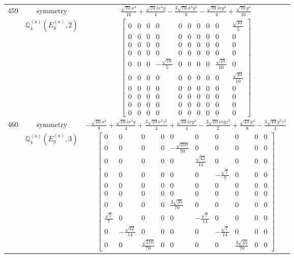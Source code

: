 \documentclass[fleqn,8pt,landscape]{jsarticle}
\begin{document}
\begin{longtable}{ccc}
$ 459 $ & $ \text{symmetry} $ & $ \frac{\sqrt{70} x^{4}}{16} + \frac{\sqrt{70} i x^{3} y}{4} - \frac{3 \sqrt{70} x^{2} y^{2}}{8} - \frac{\sqrt{70} i x y^{3}}{4} + \frac{\sqrt{70} y^{4}}{16} $ \\
$  $ & $ \mathbb{Q}_{4}^{(a)}(E_{g}^{(a)},2) $ & $ \begin{bmatrix} 0 & 0 & 0 & 0 & 0 & 0 & 0 & 0 & 0 & \frac{\sqrt{10}}{5} \\ 0 & 0 & 0 & 0 & 0 & 0 & 0 & 0 & 0 & 0 \\ 0 & 0 & 0 & 0 & 0 & 0 & 0 & 0 & 0 & 0 \\ 0 & 0 & 0 & 0 & 0 & 0 & 0 & 0 & 0 & 0 \\ 0 & 0 & 0 & - \frac{\sqrt{10}}{5} & 0 & 0 & 0 & 0 & \frac{\sqrt{10}}{10} & 0 \\ 0 & 0 & 0 & 0 & 0 & 0 & 0 & 0 & 0 & \frac{\sqrt{10}}{10} \\ 0 & 0 & 0 & 0 & 0 & 0 & 0 & 0 & 0 & 0 \\ 0 & 0 & 0 & 0 & 0 & 0 & 0 & 0 & 0 & 0 \\ 0 & 0 & 0 & 0 & 0 & 0 & 0 & 0 & 0 & 0 \\ 0 & 0 & 0 & 0 & 0 & 0 & 0 & 0 & 0 & 0 \end{bmatrix} $ \\ \hline
$ 460 $ & $ \text{symmetry} $ & $ - \frac{\sqrt{10} x^{4}}{8} + \frac{\sqrt{10} i x^{3} y}{4} + \frac{3 \sqrt{10} x^{2} z^{2}}{4} + \frac{\sqrt{10} i x y^{3}}{4} - \frac{3 \sqrt{10} i x y z^{2}}{2} + \frac{\sqrt{10} y^{4}}{8} - \frac{3 \sqrt{10} y^{2} z^{2}}{4} $ \\
$  $ & $ \mathbb{Q}_{4}^{(a)}(E_{g}^{(a)},3) $ & $ \begin{bmatrix} 0 & 0 & 0 & 0 & 0 & 0 & 0 & 0 & 0 & 0 \\ 0 & 0 & 0 & 0 & - \frac{\sqrt{210}}{70} & 0 & 0 & 0 & 0 & 0 \\ 0 & 0 & 0 & 0 & 0 & \frac{\sqrt{42}}{14} & 0 & 0 & 0 & 0 \\ 0 & 0 & 0 & 0 & 0 & 0 & - \frac{\sqrt{7}}{7} & 0 & 0 & 0 \\ 0 & 0 & 0 & 0 & 0 & 0 & 0 & 0 & 0 & 0 \\ 0 & 0 & 0 & 0 & 0 & 0 & 0 & 0 & 0 & 0 \\ 0 & 0 & 0 & 0 & \frac{3 \sqrt{35}}{70} & 0 & 0 & 0 & 0 & 0 \\ \frac{\sqrt{7}}{7} & 0 & 0 & 0 & 0 & - \frac{\sqrt{7}}{14} & 0 & 0 & 0 & 0 \\ 0 & - \frac{\sqrt{42}}{14} & 0 & 0 & 0 & 0 & - \frac{\sqrt{7}}{14} & 0 & 0 & 0 \\ 0 & 0 & \frac{\sqrt{210}}{70} & 0 & 0 & 0 & 0 & \frac{3 \sqrt{35}}{70} & 0 & 0 \end{bmatrix} $ \\ \hline

\end{longtable}
\end{document}
